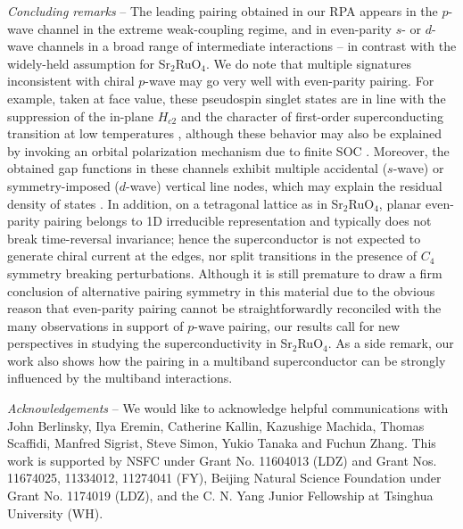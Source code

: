 \documentclass[aps,prl,twocolumn,superscriptaddress,showpacs]{revtex4-1}
\newcommand{\SRO}{Sr$_2$RuO$_4$}
\begin{document}
{\it Concluding remarks} -- The leading pairing obtained in our RPA appears in the $p$-wave channel in the extreme weak-coupling regime, and in even-parity $s$- or $d$-wave channels in a broad range of intermediate interactions -- in contrast with the widely-held assumption for \SRO. We do note that multiple signatures inconsistent with chiral $p$-wave may go very well with even-parity pairing. For example, taken at face value, these pseudospin singlet states are in line with the suppression of the in-plane $H_{c2}$ and the character of first-order superconducting transition at low temperatures \cite{Yonezawa:13,Yonezawa:14,Kittaka:14,Deguchi:02,Amano:15,Nakai:15}, although these behavior may also be explained by invoking an orbital polarization mechanism due to finite SOC \cite{Ramires:16}. Moreover, the obtained gap functions in these channels exhibit multiple accidental ($s$-wave) or symmetry-imposed ($d$-wave) vertical line nodes, which may explain the residual density of states \cite{NishiZaki:00,Hassinger:16,Ishida:97}. In addition, on a tetragonal lattice as in \SRO, planar even-parity pairing belongs to 1D irreducible representation and typically does not break time-reversal invariance; hence the superconductor is not expected to generate chiral current at the edges, nor split transitions in the presence of $C_4$ symmetry breaking perturbations. Although it is still premature to draw a firm conclusion of alternative pairing symmetry in this material due to the obvious reason that even-parity pairing cannot be straightforwardly reconciled with the many observations in support of $p$-wave pairing, our results call for new perspectives in studying the superconductivity in \SRO. As a side remark, our work also shows how the pairing in a multiband superconductor can be strongly influenced by the multiband interactions. 

{\it Acknowledgements} -- We would like to acknowledge helpful communications with John Berlinsky, Ilya Eremin, Catherine Kallin, Kazushige Machida, Thomas Scaffidi, Manfred Sigrist, Steve Simon, Yukio Tanaka and Fuchun Zhang. This work is supported by NSFC under Grant No. 11604013 (LDZ) and Grant Nos. 11674025, 11334012, 11274041 (FY), Beijing Natural Science Foundation under Grant No. 1174019 (LDZ), and the C. N. Yang Junior Fellowship at Tsinghua University (WH).
\end{document}
